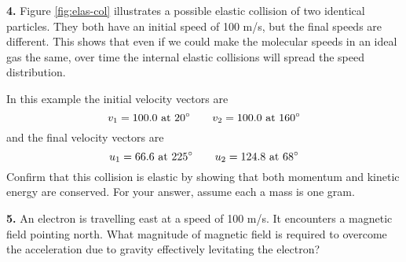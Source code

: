 \documentclass{article}
\begin{document}
\textbf{4.}
% 
%
\quad Figure \hyperref[fig:elas-col]{\ref*{fig:elas-col}} illustrates a possible elastic collision
of two identical particles. They both have an initial speed of
100 m/s, but the final speeds are different. This shows that even
if we could make the molecular speeds in an ideal gas the same,
over time the internal elastic collisions will spread the speed
distribution.


\begin{center}
\def\vx{0}
\def\vy{0.684}
\label{fig:elas-col}
\end{center}


In this example the initial velocity vectors are
%
\begin{equation*}
v_1 = 100.0 \text{ at }  20^\circ \qquad
v_2 = 100.0 \text{ at } 160^\circ
\end{equation*}
and the final velocity vectors are
%
\begin{equation*}
u_1 =  66.6 \text{ at } 225^\circ \qquad
u_2 = 124.8 \text{ at }  68^\circ
\end{equation*}
Confirm that this collision is elastic by showing that both
momentum and kinetic energy are conserved. For your answer,
assume each a mass is one gram.
%

\textbf{5.}
% 
%
\quad An electron is travelling east at a speed of 100 m/s. It encounters a magnetic field pointing north. What magnitude of magnetic field is required to overcome the acceleration due to gravity effectively levitating the electron?
%
\end{document}
